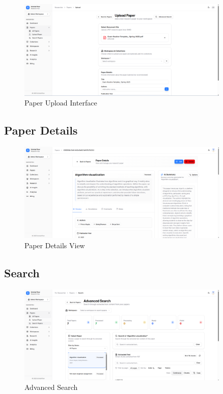 \begin{figure}[H]
\centering
\includegraphics[width=0.9\textwidth]{images/screenshots/paper_upload.png}
\caption{Paper Upload Interface}
\label{fig:ss-upload}
\end{figure}

\subsection{Paper Details}

\begin{figure}[H]
\centering
\includegraphics[width=0.9\textwidth]{images/screenshots/paper_details_1.png}
\caption{Paper Details View}
\label{fig:ss-details}
\end{figure}

\subsection{Search}

\begin{figure}[H]
\centering
\includegraphics[width=0.9\textwidth]{images/screenshots/advanced_search.png}
\caption{Advanced Search}
\label{fig:ss-search}
\end{figure}


